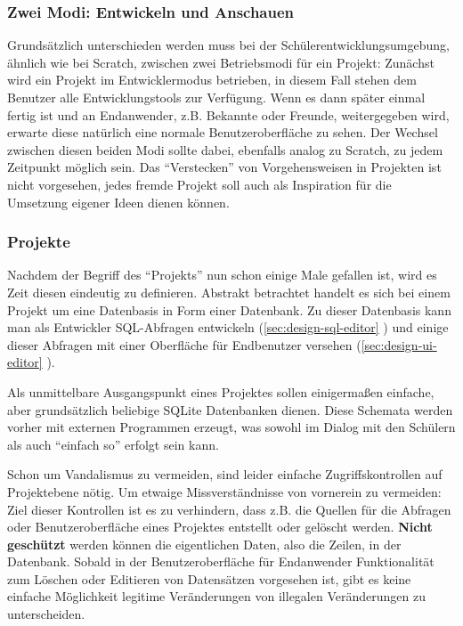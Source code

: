 \subsubsection{Zwei Modi: Entwickeln und Anschauen}

Grundsätzlich unterschieden werden muss bei der Schülerentwicklungsumgebung, ähnlich wie bei Scratch, zwischen zwei Betriebsmodi für ein Projekt: Zunächst wird ein Projekt im Entwicklermodus betrieben, in diesem Fall stehen dem Benutzer alle Entwicklungstools zur Verfügung. Wenn es dann später einmal fertig ist und an Endanwender, z.B. Bekannte oder Freunde, weitergegeben wird, erwarte diese natürlich eine normale Benutzeroberfläche zu sehen. Der Wechsel zwischen diesen beiden Modi sollte dabei, ebenfalls analog zu Scratch, zu jedem Zeitpunkt möglich sein. Das ``Verstecken'' von Vorgehensweisen in Projekten ist nicht vorgesehen, jedes fremde Projekt soll auch als Inspiration für die Umsetzung eigener Ideen dienen können.

\subsubsection{Projekte}

Nachdem der Begriff des ``Projekts'' nun schon einige Male gefallen ist, wird es Zeit diesen eindeutig zu definieren. Abstrakt betrachtet handelt es sich bei einem Projekt um eine Datenbasis in Form einer Datenbank. Zu dieser Datenbasis kann man als Entwickler SQL-Abfragen entwickeln (\ref{sec:design-sql-editor} ) und einige dieser Abfragen mit einer Oberfläche für Endbenutzer versehen (\ref{sec:design-ui-editor} ).

Als unmittelbare Ausgangspunkt eines Projektes sollen einigermaßen einfache, aber grundsätzlich beliebige SQLite Datenbanken dienen. Diese Schemata werden vorher mit externen Programmen erzeugt, was sowohl im Dialog mit den Schülern als auch ``einfach so'' erfolgt sein kann.

Schon um Vandalismus zu vermeiden, sind leider einfache Zugriffskontrollen auf Projektebene nötig. Um etwaige Missverständnisse von vornerein zu vermeiden: Ziel dieser Kontrollen ist es zu verhindern, dass z.B. die Quellen für die Abfragen oder Benutzeroberfläche eines Projektes entstellt oder gelöscht werden. \textbf{Nicht geschützt} werden können die eigentlichen Daten, also die Zeilen, in der Datenbank. Sobald in der Benutzeroberfläche für Endanwender Funktionalität zum Löschen oder Editieren von Datensätzen vorgesehen ist, gibt es keine einfache Möglichkeit legitime Veränderungen von illegalen Veränderungen zu unterscheiden.

